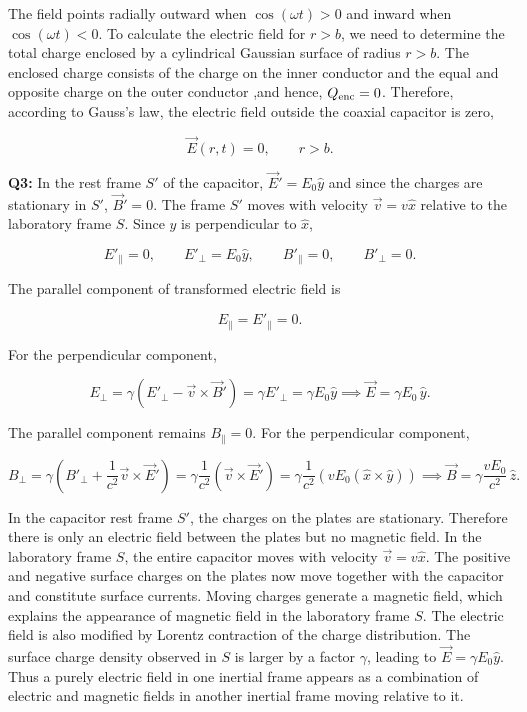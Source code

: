 \documentclass[a4paper,12pt]{article}
\begin{document}
The field points radially outward when \(\cos(\omega t)>0\) and inward when \(\cos(\omega t)<0\). To calculate the electric field for \(r>b\), we need to determine the total charge enclosed by a cylindrical Gaussian surface of radius \(r>b\). The enclosed charge consists of the charge on the inner conductor and the equal and opposite charge on the outer conductor ,and hence,  $Q_{\rm enc}=0$. Therefore, according to Gauss's law, the electric field outside the coaxial capacitor is zero,

\[
\boxed{
\vec E(r,t)=0,
\qquad r>b.
}
\]

\textbf{Q3:} In the rest frame \(S'\) of the capacitor, $\vec E' = E_0 \hat y$ and since the charges are stationary in \(S'\), $\vec B' = 0$. The frame \(S'\) moves with velocity $\vec v = v\hat x$ relative to the laboratory frame \(S\). Since \(\hat y\) is perpendicular to \(\hat x\),

\[
E'_{\parallel}=0,
\qquad
E'_{\perp}=E_0\hat y,
\qquad
B'_{\parallel}=0,
\qquad
B'_{\perp}=0.
\]

The parallel component of transformed electric field is

\[
E_{\parallel}=E'_{\parallel}=0.
\]

For the perpendicular component,

\[
E_{\perp}
=
\gamma
\left(
E'_{\perp}-\vec v\times \vec B'
\right) = \gamma E'_{\perp}
=
\gamma E_0\hat y \implies \boxed{
\vec E
=
\gamma E_0\,\hat y.
}
\]


The parallel component remains $B_{\parallel}=0$. For the perpendicular component,

\[
B_{\perp}
=
\gamma
\left(
B'_{\perp}
+\frac{1}{c^2}\vec v\times \vec E'
\right) = 
\gamma
\frac{1}{c^2}
(\vec v\times\vec E') = 
\gamma
\frac{1}{c^2}
(vE_0(\hat x\times\hat y)) \implies \boxed{
\vec B
=
\gamma\frac{vE_0}{c^2}\,\hat z.
}
\]

In the capacitor rest frame \(S'\), the charges on the plates are stationary. Therefore there is only an electric field between the plates but no magnetic field. In the laboratory frame \(S\), the entire capacitor moves with velocity
\(\vec v=v\hat x\). The positive and negative surface charges on the plates now move together with the capacitor and constitute surface currents. Moving charges generate a magnetic field, which explains the appearance of magnetic field in the laboratory frame \(S\). The electric field is also modified by Lorentz contraction of the charge distribution. The surface charge density observed in \(S\) is larger by a factor \(\gamma\), leading to $\vec E=\gamma E_0\hat y$. Thus a purely electric field in one inertial frame appears as a combination of electric and magnetic fields in another inertial frame moving relative to it.
\end{document}
